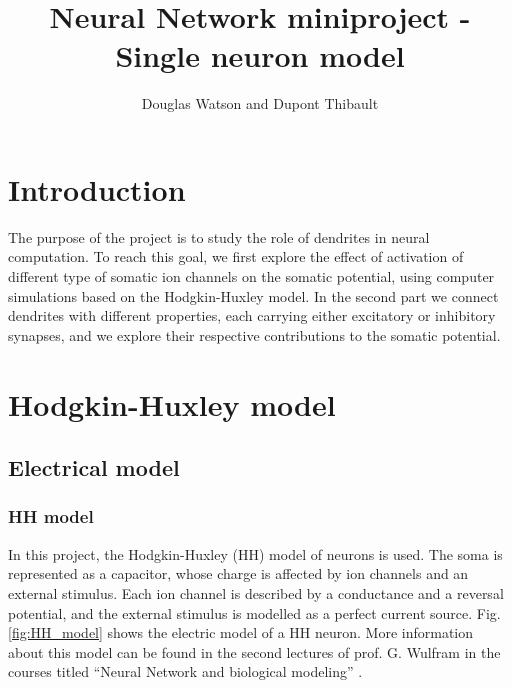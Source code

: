 \documentclass[a4paper, 10pt, conference]{ieeeconf}      %
\title{\LARGE \bf
Neural Network miniproject - Single neuron model
}
\author{Douglas Watson and Dupont Thibault}
\begin{document}
\newcommand{\order}[1]{$\cdot 10^{#1}$}
\newcommand{\pvalue}[2]{p-value $< #1 \cdot 10^{#2}$}
\renewcommand{\thefigure}{\arabic{figure}}

\maketitle
\thispagestyle{fancyplain}




\setcounter{tocdepth}{10}
\tableofcontents

\section{Introduction}
The purpose of the project is to study the role of dendrites in neural computation. To reach this goal, we first explore the effect of activation of different type of somatic ion channels on the somatic potential, using computer simulations based on the Hodgkin-Huxley model. In the second part we connect dendrites with different properties, each carrying either excitatory or inhibitory synapses, and we explore their respective contributions to the somatic potential. \\

\section{Hodgkin-Huxley model}




\subsection{Electrical model}



\subsubsection*{HH model}

In this project, the Hodgkin-Huxley (HH) model of neurons is used. The soma is represented as a capacitor, whose charge is affected by ion channels and an external stimulus. Each ion channel is described by a conductance and a reversal potential, and the external stimulus is modelled as a perfect current source. Fig. \ref{fig:HH_model} shows the electric model of a HH neuron. More information about this model can be found in the second lectures of prof. G. Wulfram in the courses titled “Neural Network and biological modeling” \cite{course}. \\
\end{document}

